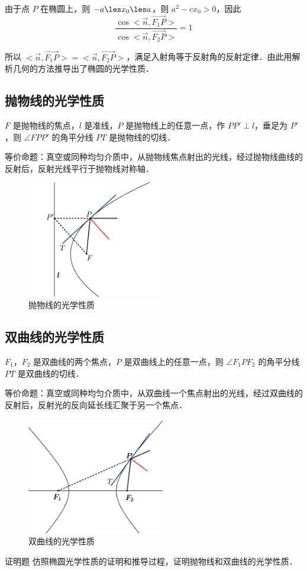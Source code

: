 由于点 $P$ 在椭圆上，则 $-a\les x_0 \les a$，则 $a^2-cx_0 >0$，因此
\begin{equation}
\frac{\cos<\vec n,\overrightarrow{F_1P}>}{\cos<\vec n,\overrightarrow{F_2P}>}=1
\end{equation}

所以 $<\vec n,\overrightarrow{F_1P}>=<\vec n,\overrightarrow{F_2P}>$，满足入射角等于反射角的反射定律．由此用解析几何的方法推导出了椭圆的光学性质．


\subsection{抛物线的光学性质}
$F$ 是抛物线的焦点，$l$ 是准线，$P$ 是抛物线上的任意一点，作 $PP' \perp l$，垂足为 $P'$，则 $\angle FPP' $ 的角平分线 $ PT $ 是抛物线的切线．

等价命题：真空或同种均匀介质中，从抛物线焦点射出的光线，经过抛物线曲线的反射后，反射光线平行于抛物线对称轴．
\begin{figure}[ht]
\centering
\includegraphics[width=6cm]{./figures/ConOpt4.pdf}
\caption{抛物线的光学性质} \label{ConOpt_fig4}
\end{figure}

\subsection{双曲线的光学性质}
$F_1$，$F_2$ 是双曲线的两个焦点，$P$ 是双曲线上的任意一点，则 $\angle F_1PF_2 $ 的角平分线 $ PT $ 是双曲线的切线．

等价命题：真空或同种均匀介质中，从双曲线一个焦点射出的光线，经过双曲线的反射后，反射光的反向延长线汇聚于另一个焦点．
\begin{figure}[ht]
\centering
\includegraphics[width=6cm]{./figures/ConOpt5.pdf}
\caption{双曲线的光学性质} \label{ConOpt_fig5}
\end{figure}

\begin{exer}{证明题}\label{ConOpt_exe1}
仿照椭圆光学性质的证明和推导过程，证明抛物线和双曲线的光学性质．
\end{exer}
